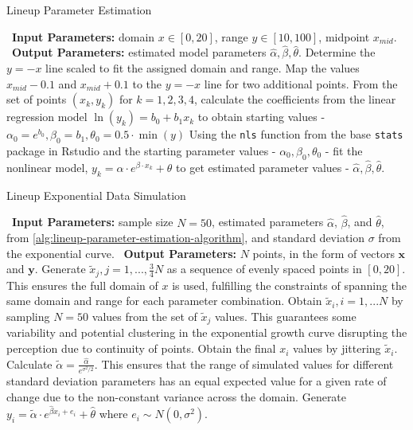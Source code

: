 \documentclass[12pt]{article}
\begin{document}
\begin{algorithm}
  \caption{Lineup Parameter Estimation}\label{alg:lineup-parameter-estimation-algorithm}
  \begin{algorithmic}[1]
    \Statex \hspace*{-1em}\textbullet~\textbf{Input Parameters:} domain $x\in[0,20]$, range $y\in[10,100]$, midpoint $x_{mid}$.
    \Statex \hspace*{-1em}\textbullet~\textbf{Output Parameters:} estimated model parameters $\hat\alpha, \hat\beta, \hat\theta$.
    \State Determine the $y=-x$ line scaled to fit the assigned domain and range.
    \State Map the values $x_{mid} - 0.1$ and $x_{mid} + 0.1$ to the $y=-x$ line for two additional points.
    \State From the set of points $(x_k, y_k)$ for $k = 1,2,3,4$, calculate the coefficients from the linear regression model $\ln(y_k) = b_0 +b_1x_k$ to obtain starting values - $\alpha_0 = e^{b_0}, \beta_0 =  b_1, \theta_0 = 0.5\cdot \min(y)$
    \State Using the \texttt{nls} function from the base \texttt{stats} package in Rstudio and the starting parameter values - $\alpha_0, \beta_0, \theta_0$ - fit the nonlinear model, $y_k = \alpha\cdot e^{\beta\cdot x_k}+\theta$ to get estimated parameter values - $\hat\alpha, \hat\beta, \hat\theta.$
  \end{algorithmic}
\end{algorithm}

\begin{algorithm}
  \caption{Lineup Exponential Data Simulation}\label{alg:lineup-exponential-data-simulation-algorithm}
  \begin{algorithmic}[1]
    \Statex \hspace*{-1em}\textbullet~\textbf{Input Parameters:} sample size $N = 50$, estimated parameters $\hat\alpha$, $\hat\beta$, and $\hat\theta$, from \cref{alg:lineup-parameter-estimation-algorithm}, and standard deviation $\sigma$ from the exponential curve.
    \Statex \hspace*{-1em}\textbullet~\textbf{Output Parameters:} $N$ points, in the form of vectors $\mathbf{x}$ and $\mathbf{y}$.
    \State Generate $\tilde x_j, j = 1,..., \frac{3}{4}N$ as a sequence of evenly spaced points in $[0,20]$. This ensures the full domain of $x$ is used, fulfilling the constraints of spanning the same domain and range for each parameter combination.
    \State Obtain $\tilde x_i, i = 1,...N$ by sampling $N = 50$ values from the set of $\tilde x_j$ values. This guarantees some variability and potential clustering in the exponential growth curve disrupting the perception due to continuity of points.
    \State Obtain the final $x_i$ values by jittering $\tilde x_i$.
    \State Calculate $\tilde\alpha = \frac{\hat\alpha}{e^{\sigma^2/2}}.$ This ensures that the range of simulated values for different standard deviation parameters has an equal expected value for a given rate of change due to the non-constant variance across the domain.
    \State Generate $y_i = \tilde\alpha\cdot e^{\hat\beta x_i + e_i}+\hat\theta$ where $e_i\sim N(0,\sigma^2).$
  \end{algorithmic}
\end{algorithm}
\end{document}
